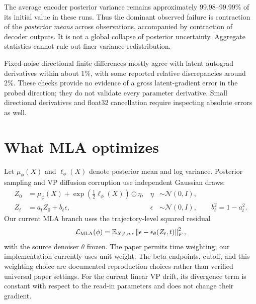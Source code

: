 \documentclass[11pt,a4paper]{article}
\newcommand{\E}{\mathbb{E}}
\begin{document}
The average encoder posterior variance remains approximately 99.98--99.99\%
of its initial value in these runs. Thus the dominant observed failure is
contraction of the \emph{posterior means} across observations, accompanied by
contraction of decoder outputs. It is not a global collapse of posterior
uncertainty. Aggregate statistics cannot rule out finer variance redistribution.

Fixed-noise directional finite differences mostly agree with latent autograd
derivatives within about 1\%, with some reported relative discrepancies around
2\%. These checks provide no evidence of a gross latent-gradient error in the
probed direction; they do not validate every parameter derivative. Small
directional derivatives and float32 cancellation require inspecting absolute
errors as well.

\section{What MLA optimizes}

Let $\mu_\phi(X)$ and $\ell_\phi(X)$ denote posterior mean and log variance.
Posterior sampling and VP diffusion corruption use independent Gaussian draws:
\begin{align}
 Z_0 &= \mu_\phi(X)+\exp\!\left(\tfrac12\ell_\phi(X)\right)\odot\eta,
 &\eta&\sim\mathcal N(0,I),\\
 Z_t &= a_t Z_0+b_t\epsilon,
 &\epsilon&\sim\mathcal N(0,I),\qquad b_t^2=1-a_t^2.
\end{align}
Our current MLA branch uses the trajectory-level squared residual
\begin{equation}
 \mathcal L_{\rm MLA}(\phi)
 =\E_{X,t,\eta,\epsilon}
 \left\|\epsilon-\epsilon_\theta(Z_t,t)\right\|_F^2,
 \label{eq:mla}
\end{equation}
with the source denoiser $\theta$ frozen. The paper permits time weighting;
our implementation currently uses unit weight. The beta endpoints, cutoff,
and this weighting choice are documented reproduction choices rather than
verified universal paper settings. For the current linear VP drift, its
divergence term is constant with respect to the read-in parameters and does
not change their gradient.
\end{document}
